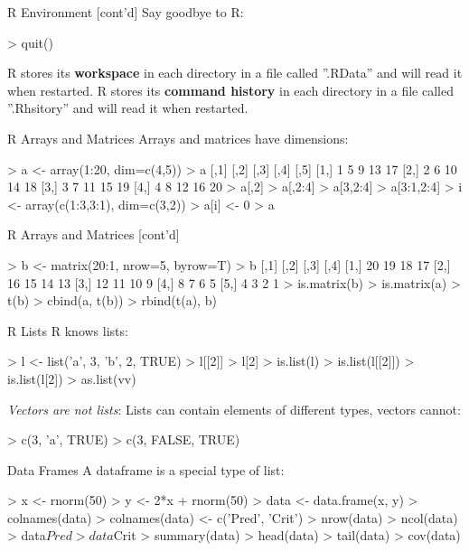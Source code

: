 \documentclass[ignorenonframetext,xcolor=x11names]{beamer}
\begin{document}
\begin{frame}[fragile]{R Environment \small [cont'd]}
Say goodbye to R:
\begin{Rcode}
> quit()
\end{Rcode}
R stores its \textbf{workspace} in each directory in a file called ''.RData'' and will read it when restarted. R stores its \textbf{command history} in each directory in a file called ''.Rhsitory'' and will read it when restarted.
\end{frame}

\begin{frame}[fragile]{R Arrays and Matrices}
Arrays and matrices have dimensions:
\begin{Rcode}
> a <- array(1:20, dim=c(4,5))
> a
     [,1] [,2] [,3] [,4] [,5]
[1,]    1    5    9   13   17
[2,]    2    6   10   14   18
[3,]    3    7   11   15   19
[4,]    4    8   12   16   20
> a[,2]
> a[,2:4]
> a[3,2:4]
> a[3:1,2:4]
> i <- array(c(1:3,3:1), dim=c(3,2))
> a[i] <- 0
> a
\end{Rcode}
\end{frame}

\begin{frame}[fragile]{R Arrays and Matrices \small [cont'd]}
\begin{Rcode}
> b <- matrix(20:1, nrow=5, byrow=T)
> b
     [,1] [,2] [,3] [,4]
[1,]   20   19   18   17
[2,]   16   15   14   13
[3,]   12   11   10    9
[4,]    8    7    6    5
[5,]    4    3    2    1
> is.matrix(b)
> is.matrix(a)
> t(b)
> cbind(a, t(b))
> rbind(t(a), b)
\end{Rcode}
\end{frame}


\begin{frame}[fragile]{R Lists}
R knows lists:
\begin{Rcode}
> l <- list('a', 3, 'b', 2, TRUE)
> l[[2]]
> l[2]
> is.list(l)
> is.list(l[[2]])
> is.list(l[2])
> as.list(vv)
\end{Rcode}
\emph{Vectors are not lists}: Lists can contain elements of different types, vectors cannot:
\begin{Rcode}
> c(3, 'a', TRUE)
> c(3, FALSE, TRUE)
\end{Rcode}
\end{frame}


\begin{frame}[fragile]{Data Frames}
A dataframe is a special type of list:
\begin{Rcode}
> x <- rnorm(50)
> y <- 2*x + rnorm(50)
> data <- data.frame(x, y)
> colnames(data)
> colnames(data) <- c('Pred', 'Crit')
> nrow(data)
> ncol(data)
> data$Pred
> data$Crit
> summary(data)
> head(data)
> tail(data)
> cov(data)
\end{Rcode}
\end{frame}
\end{document}
